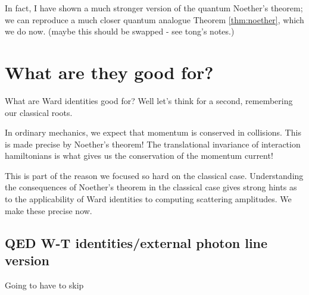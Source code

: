 \documentclass[main.tex]{subfiles}
\begin{document}
In fact, I have shown a much stronger version of the quantum Noether's theorem; we can reproduce a much closer quantum analogue Theorem \ref{thm:noether}, which we do now. (maybe this should be swapped - see tong's notes.)

\section{What are they good for?}
What are Ward identities good for? Well let's think for a second, remembering our classical roots. 

In ordinary mechanics, we expect that momentum is conserved in collisions. This is made precise by Noether's theorem! The translational invariance of interaction hamiltonians is what gives us the conservation of the momentum current!

This is part of the reason we focused so hard on the classical case. Understanding the consequences of Noether's theorem in the classical case gives strong hints as to the applicability of Ward identities to computing scattering amplitudes. We make these precise now.

\subsection{QED W-T identities/external photon line version}

Going to have to skip
\end{document}
